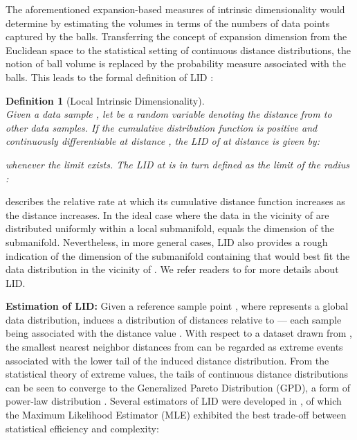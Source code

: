 \documentclass{article}
\newtheorem{definition}{Definition}
\begin{document}
The aforementioned expansion-based measures of intrinsic dimensionality would determine  by estimating the volumes in terms of the numbers of data points captured by the balls. Transferring the concept of expansion dimension from the Euclidean space to the statistical setting of continuous distance distributions, the notion of ball volume is replaced by the probability measure associated with the balls. This leads to the formal definition of LID \cite{houle2017local1}:



\begin{definition}[Local Intrinsic Dimensionality] \quad \\
Given a data sample , let  be a random variable denoting the distance from  to other data samples. If the cumulative distribution function  is positive and continuously differentiable at distance , the LID of  at distance  is given by:

whenever the limit exists.
\label{def:lid}
The \textup{LID} at  is in turn defined as the limit of the radius : 

\end{definition}
 describes the relative rate at which its cumulative distance function  increases as the distance  increases. In the ideal case where the data in the vicinity of  are distributed uniformly within a local submanifold,  equals the dimension of the submanifold. Nevertheless, in more general cases, LID also provides a rough indication of the dimension of the submanifold containing  that would best fit the data distribution in the vicinity of . 
 We refer readers to \cite{houle2017local1,houle2017local2} for more details about LID.



\textbf{Estimation of LID:}
Given a reference sample point , where  represents a global data distribution,  induces a distribution of distances relative to  --- each sample  being associated with the distance value . With respect to a dataset  drawn from , the smallest  nearest neighbor distances from  can be regarded as extreme events associated with the lower tail of the induced distance distribution. From the statistical theory of extreme values, the tails of continuous distance distributions can be seen to converge to the Generalized Pareto Distribution (GPD), a form of power-law distribution \cite{coles2001introduction,hill1975simple}.
Several estimators of LID were developed in \cite{amsaleg2015estimating,levina2005maximum}, of which the Maximum Likelihood Estimator (MLE) exhibited the best trade-off between statistical efficiency and complexity:
\end{document}
